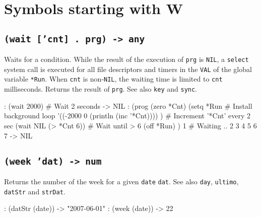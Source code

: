 %
%
%



\chapter{Symbols starting with W}
\label{cha:func-ref-W-functions-starting-with-W}

 
\section*{\texttt{(wait ['cnt] . prg) -> any}}
\label{sec:func-ref-W-(wait ['cnt] . prg) -> any}


Waits for a condition. While the result of the execution of \texttt{prg} is
\texttt{NIL}, a \texttt{select} system call is executed for all file descriptors and
timers in the \texttt{VAL} of the global variable \texttt{*Run}. When \texttt{cnt} is
non-\texttt{NIL}, the waiting time is limited to \texttt{cnt} milliseconds. Returns
the result of \texttt{prg}. See also \texttt{key} and \texttt{sync}.


\begin{wideverbatim}
: (wait 2000)                                # Wait 2 seconds
-> NIL
: (prog
   (zero *Cnt)
   (setq *Run                                # Install background loop
      '((-2000 0 (println (inc '*Cnt)))) )   # Increment '*Cnt' every 2 sec
   (wait NIL (> *Cnt 6))                     # Wait until > 6
   (off *Run) )
1                                            # Waiting ..
2
3
4
5
6
7
-> NIL
\end{wideverbatim}

 
\section*{\texttt{(week 'dat) -> num}}
\label{sec:func-ref-W-(week 'dat) -> num}


Returns the number of the week for a given \texttt{date} \texttt{dat}. See also \texttt{day},
\texttt{ultimo}, \texttt{datStr} and \texttt{strDat}.


\begin{wideverbatim}
: (datStr (date))
-> "2007-06-01"
: (week (date))
-> 22
\end{wideverbatim}

